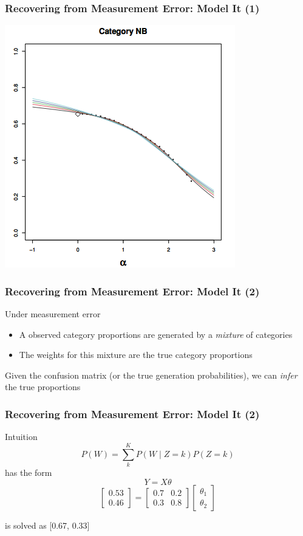 \documentclass[11pt,compress,professionalfonts]{beamer}
\newcommand{\ita}{\begin{itemize}}
\newcommand{\itm}{\item[]}
\newcommand{\itz}{\end{itemize}}
\begin{document}
\begin{frame}[t]\frametitle{Recovering from Measurement Error: Model It (1)}

\centerline{\includegraphics[scale=.8]{pictures/simex-proportion-hopkins-king}}

\end{frame}
\begin{frame}[t]\frametitle{Recovering from Measurement Error: Model It (2)}

Under measurement error
\ita
\itm A observed category proportions are generated by a \textit{mixture} of categories
\itm The weights for this mixture are the true category proportions
\itz
Given the confusion matrix (or the true generation probabilities), we can \textit{infer} the true proportions

\end{frame}
\begin{frame}[t]\frametitle{Recovering from Measurement Error: Model It (2)}

Intuition
\[
{P(W)} = \sum^K_k {P(W \mid Z=k)} P(Z=k)
\]
has the form
\[
Y = X\theta
\]
\[
\left[\begin{array}{c}0.53 \\0.46\end{array}\right] =
\left[\begin{array}{cc}0.7 & 0.2 \\0.3 & 0.8\end{array}\right] \left[\begin{array}{c}\theta_1 \\\theta_2\end{array}\right]
\]

is solved as [0.67, 0.33]

\end{frame}
\end{document}
